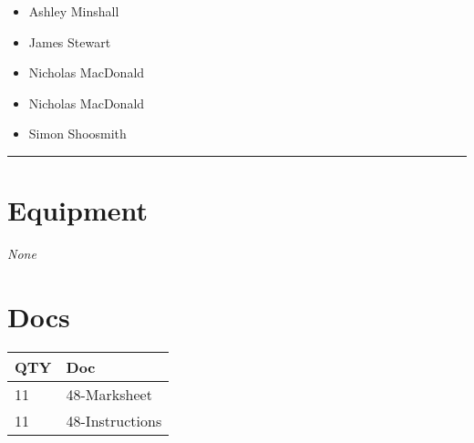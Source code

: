 \documentclass[10pt]{article}
\begin{document}
	\begin{multicols}{2}

		\begin{itemize}
									\item Ashley Minshall
									\item James Stewart
									\item Nicholas MacDonald
						\end{itemize}

		\vfill\null
		\columnbreak

		\begin{itemize}
									\item Nicholas MacDonald
									\item Simon Shoosmith
						\end{itemize}

		\vfill\null

		\end{multicols}



			\vspace{0.5cm}
	\hrule
	\vspace{0.5cm}

	\begin{multicols}{2}

		\section*{\faWrench \: Equipment}

				\textit{None}
		
		\vfill\null
		\columnbreak

			\section*{\faFile \: Docs}
		 	\begin{center}
			\begin{tabular}{p{2cm}p{4cm}}

			\textbf{QTY} & \textbf{Doc} \\\toprule
										11&48-Marksheet\\\midrule
										11&48-Instructions\\\midrule
							\end{tabular}
			\end{center}
	

		\vfill\null

		\end{multicols}
\end{document}
